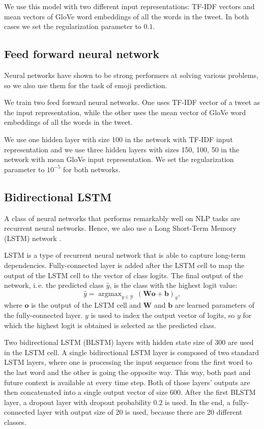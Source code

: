 \documentclass[10pt, a4paper]{article}
\DeclareMathOperator*{\argmax}{argmax}
\begin{document}
We use this model with two different input representations: TF-IDF vectors and 
mean vectors of GloVe word embeddings of all the words in the tweet. In both 
cases we set the regularization parameter to $0.1$.

\subsection{Feed forward neural network}

Neural networks have shown to be strong performers at solving various problems,
so we also use them for the task of emoji prediction. 

We train two feed forward neural networks. One uses TF-IDF vector of a tweet as 
the input representation, while the other uses the mean vector of GloVe word 
embeddings of all the words in the tweet.

We use one hidden layer with size 100 in the network with TF-IDF input 
representation and we use three hidden layers with sizes 150, 100, 50 in the 
network with mean GloVe input representation. We set the regularization 
parameter to $10^{-5}$ for both networks.

\subsection{Bidirectional LSTM}

A class of neural networks that performs remarkably well on NLP tasks are 
recurrent neural networks. Hence, we also use a Long Short-Term Memory (LSTM) 
network \citep{hochreiter1997long}.

LSTM is a type of recurrent neural network that is able to capture long-term 
dependencies. Fully-connected layer is added after the LSTM cell to map the 
output of the LSTM cell to the vector of class logits. The final output of the 
network, i.\,e. the predicted class $\hat{y}$, is the class with the highest 
logit value:
$$\hat{y} = \argmax_{y \in \mathcal{Y}} 
    \,(\mathbf{W} \mathbf{o} + \mathbf{b})_y,$$
where $\mathbf{o}$ is the output of the LSTM cell and $\mathbf{W}$ and 
$\mathbf{b}$ are learned parameters of the fully-connected layer. $y$ is used to
index the output vector of logits, so $y$ for which the highest logit is 
obtained is selected as the predicted class.

Two bidirectional LSTM (BLSTM) layers with hidden state size of 300 are used in 
the LSTM cell. A single bidirectional LSTM layer is composed of two standard 
LSTM layers, where one is processing the input sequence from the first word to 
the last word and the other is going the opposite way. This way, both past and 
future context is available at every time step. Both of those layers' outputs 
are then concatenated into a single output vector of size 600. After the first 
BLSTM layer, a dropout layer with dropout probability $0.2$ is used. In the end,
a fully-connected layer with output size of 20 is used, because there are 20 
different classes.
\end{document}
